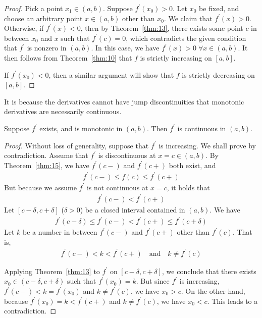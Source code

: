 \documentclass[thmcnt=section, 12pt]{my-elegantbook}
\begin{document}
\begin{proof}
    Pick a point $x_1 \in (a, b)$. Suppose $f^\prime(x_0) > 0$. Let $x_0$ be fixed, and choose an arbitrary point $x \in (a, b)$ other than $x_0$. We claim that $f^\prime(x) > 0$. Otherwise, if $f^\prime(x) < 0$, then by Theorem~\ref{thm:13}, there exists some point $c$ in between $x_0$ and $x$ such that $f^\prime(c) = 0$, which contradicts the given condition that $f^\prime$ is nonzero in $(a, b)$. In this case, we have $f^\prime(x) > 0 \; \forall x \in (a, b)$. It then follows from Theorem~\ref{thm:10} that $f$ is strictly increasing on $[a, b]$.

    \par If $f^\prime(x_0) < 0$, then a similar argument will show that $f$ is strictly decreasing on $[a, b]$.
\end{proof}


\par It is because the derivatives cannot have jump discontinuities that monotonic derivatives are necessarily continuous.

\begin{theorem}
    Suppose $f^\prime$ exists, and is monotonic in $(a, b)$. Then $f^\prime$ is continuous in $(a, b)$.
\end{theorem}

\begin{proof}
    Without loss of generality, suppose that $f^\prime$ is increasing. We shall prove by contradiction. Assume that $f^\prime$ is discontinuous at $x = c \in (a, b)$. By Theorem~\ref{thm:15}, we have $f^\prime(c-)$ and $f^\prime(c+)$ both exist, and 
    \begin{align*}
        f^\prime(c-) \leq f(c) \leq f^\prime(c+)
    \end{align*}
    But because we assume $f^\prime$ is not continuous at $x = c$, it holds that 
    \begin{align*}
        f^\prime(c-) < f^\prime(c+)
    \end{align*}
    Let $[c-\delta, c+\delta]$ ($\delta > 0$) be a closed interval contained in $(a, b)$. We have 
    \begin{align*}
        f^\prime(c-\delta) \leq f^\prime(c-) < f^\prime(c+) \leq f^\prime(c+\delta)
    \end{align*}
    Let $k$ be a number in between $f^\prime(c-)$ and $ f^\prime(c+)$ other than $f^\prime(c)$. That is, 
    \begin{align*}
        f^\prime(c-) < k < f^\prime(c+) 
        \quad \text{and} \quad 
        k \neq f^\prime(c)
    \end{align*}
    
    \par Applying Theorem~\ref{thm:13} to $f^\prime$ on $[c-\delta, c+\delta]$, we conclude that there exists $x_0 \in (c-\delta, c+\delta)$ such that $f^\prime(x_0) = k$. But since $f^\prime$ is increasing, $f^\prime(c-) < k = f^\prime(x_0)$ and $k \neq f^\prime(c)$, we have $x_0 > c$. On the other hand, because $ f^\prime(x_0) = k < f^\prime(c+) $ and $k \neq f^\prime(c)$, we have $x_0 < c$. This leads to a contradiction. 
\end{proof}
\end{document}
